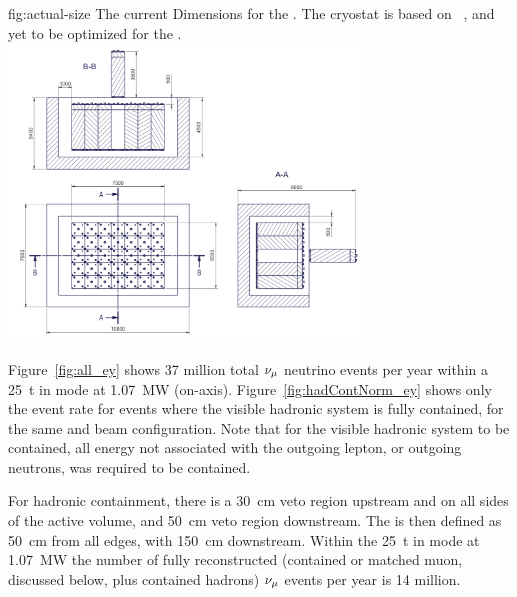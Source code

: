 \begin{dunefigure}{fig:actual-size}
{The current  Dimensions for the   . The cryostat is based on ~\cite{Abi:2017aow}, and yet to be optimized for the   .}
	\includegraphics[width=0.7\textwidth]{graphics/actual-size.png}
\end{dunefigure}

\label{sec:appx-nd::rates}

Figure~\ref{fig:all_ey} shows 37 million total  $\nu_\mu$ neutrino events per year within a \SI{25}{\tonne}  in  mode at \SI{1.07}{\mega\watt} (on-axis). Figure~\ref{fig:hadContNorm_ey} shows only the event rate for events where the visible hadronic system is fully contained, for the same  and beam configuration. Note that for the visible hadronic system to be contained, all energy not associated with the outgoing lepton, or outgoing neutrons, was required to be contained. 


For hadronic containment, there is a \SI{30}{\centi\metre} veto region upstream and on all sides of the active volume, and \SI{50}{\centi\metre} veto region downstream. The  is then defined as \SI{50}{\centi\metre} from all edges, with \SI{150}{\centi\metre} downstream.  Within the \SI{25}{\tonne}  in  mode at \SI{1.07}{\mega\watt} the number of fully reconstructed (contained or matched muon, discussed below, plus contained hadrons)  $\nu_\mu$ events per year is 14 million.   

